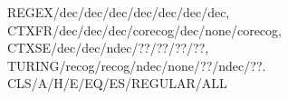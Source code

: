 REGEX/dec/dec/dec/dec/dec/dec/dec,
CTXFR/dec/dec/dec/corecog/dec/none/corecog,
CTXSE/dec/dec/ndec/??/??/??/??,
TURING/recog/recog/ndec/none/??/ndec/??.
CLS/A/H/E/EQ/ES/REGULAR/ALL
